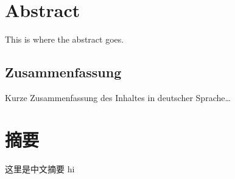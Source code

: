 \begingroup
\let\clearpage\relax
\let\cleardoublepage\relax
\let\cleardoublepage\relax

\chapter*{Abstract}
This is where the abstract goes. 

\vfill

\begin{otherlanguage}{ngerman}
\chapter*{Zusammenfassung}
Kurze Zusammenfassung des Inhaltes in deutscher Sprache\dots
\end{otherlanguage}

\vfill

\begin{otherlanguage}{chinese}

\chapter*{摘要}
这里是中文摘要   hi

\end{otherlanguage}

\vfill

\endgroup